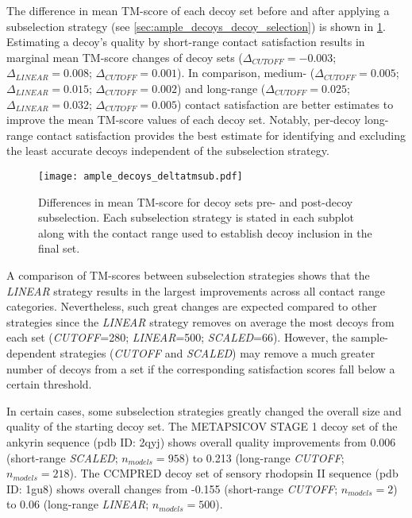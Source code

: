The difference in mean TM-score of each decoy set before and after applying a subselection strategy (see \cref{sec:ample_decoys_decoy_selection}) is shown in \cref{fig:ample_decoys_deltatmsub}. Estimating a decoy's quality by short-range contact satisfaction results in marginal mean TM-score changes of decoy sets ($\Delta_{CUTOFF}=-0.003$; $\Delta_{LINEAR}=0.008$; $\Delta_{CUTOFF}=0.001$). In comparison, medium- ($\Delta_{CUTOFF}=0.005$; $\Delta_{LINEAR}=0.015$; $\Delta_{CUTOFF}=0.002$) and long-range ($\Delta_{CUTOFF}=0.025$; $\Delta_{LINEAR}=0.032$; $\Delta_{CUTOFF}=0.005$) contact satisfaction are better estimates to improve the mean TM-score values of each decoy set. Notably, per-decoy long-range contact satisfaction provides the best estimate for identifying and excluding the least accurate decoys independent of the subselection strategy. 

\begin{figure}[H]
	\centering
	\texttt{[image: ample\_decoys\_deltatmsub.pdf]}
        \caption[TM-score comparison pre- and post-decoy subselection]{Differences in mean TM-score  for decoy sets pre- and post-decoy subselection. Each subselection strategy is stated in each subplot along with the contact range used to establish decoy inclusion in the final set.}
	\label{fig:ample_decoys_deltatmsub}
\end{figure}

A comparison of \textDelta TM-scores between subselection strategies shows that the \textit{LINEAR} strategy results in the largest improvements across all contact range categories. Nevertheless, such great changes are expected compared to other strategies since the \textit{LINEAR} strategy removes on average the most decoys from each set (\textit{CUTOFF}=280; \textit{LINEAR}=500; \textit{SCALED}=66). However, the sample-dependent strategies (\textit{CUTOFF} and \textit{SCALED}) may remove a much greater number of decoys from a set if the corresponding satisfaction scores fall below a certain threshold.

In certain cases, some subselection strategies greatly changed the overall size and quality of the starting decoy set. The METAPSICOV STAGE 1 decoy set of the ankyrin sequence (\gls{pdb} ID: 2qyj) shows overall quality improvements from 0.006 (short-range \textit{SCALED}; $n_{models}=958$) to 0.213 (long-range \textit{CUTOFF}; $n_{models}=218$). The CCMPRED decoy set of sensory rhodopsin II sequence (\gls{pdb} ID: 1gu8) shows overall changes from -0.155 (short-range \textit{CUTOFF}; $n_{models}=2$) to 0.06 (long-range \textit{LINEAR}; $n_{models}=500$).

